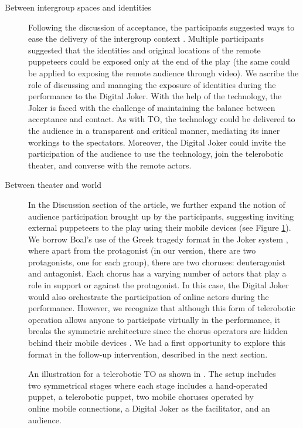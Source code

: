 \documentclass[dissertation,math,vertlayout,pdfa,colorlinks]{aaltoseries}
\begin{document}
\begin{description}
   \item[Between intergroup spaces and identities] Following the discussion of acceptance, the participants suggested ways to ease the delivery of the intergroup context \cite[p. 16]{peledTeleroboticTheaterOppressed2025}. Multiple participants suggested that the identities and original locations of the remote puppeteers could be exposed only at the end of the play (the same could be applied to exposing the remote audience through video). We ascribe the role of discussing and managing the exposure of identities during the performance to the Digital Joker. With the help of the technology, the Joker is faced with the challenge of maintaining the balance between acceptance and contact. As with TO, the technology could be delivered to the audience in a transparent and critical manner, mediating its inner workings to the spectators. Moreover, the Digital Joker could invite the participation of the audience to use the technology, join the telerobotic theater, and converse with the remote actors.
   \item[Between theater and world] In the Discussion section of the article, we further expand the notion of audience participation brought up by the participants, suggesting inviting external puppeteers to the play using their mobile devices \cite[p. 20]{peledTeleroboticTheaterOppressed2025} (see Figure \ref{fig:telerobotic-to}). We borrow Boal's use of the Greek tragedy format in the Joker system \cite[p. 160]{boalTheatreOppressed2008}, where apart from the protagonist (in our version, there are two protagonists, one for each group), there are two choruses: deuteragonist and antagonist. Each chorus has a varying number of actors that play a role in support or against the protagonist. In this case, the Digital Joker would also orchestrate the participation of online actors during the performance. However, we recognize that although this form of telerobotic operation allows anyone to participate virtually in the performance, it breaks the symmetric architecture since the chorus operators are hidden behind their mobile devices \cite[p. 20]{peledTeleroboticTheaterOppressed2025}. We had a first opportunity to explore this format in the follow-up intervention, described in the next section.
\end{description}


\begin{figure}
    \centering
    
    \caption{An illustration for a telerobotic TO as shown in \cite{peledTeleroboticTheaterOppressed2025}. The setup includes two symmetrical stages where each stage includes a hand-operated puppet, a telerobotic puppet, two mobile choruses operated by online mobile connections, a Digital Joker as the facilitator, and an audience.}
    \label{fig:telerobotic-to}
\end{figure}
\end{document}
